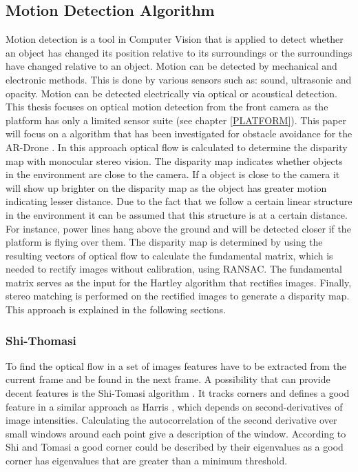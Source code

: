 \documentclass[a4paper]{article}
\begin{document}
\subsection{Motion Detection Algorithm}
\label{MOTION_DETECTION}
Motion detection is a tool in Computer Vision that is applied to detect whether an object has changed its position relative to its surroundings or the surroundings have changed relative to an object. Motion can be detected by mechanical and electronic methods. This is done by various sensors such as: sound, ultrasonic and opacity. Motion can be detected electrically via optical or acoustical detection. This thesis focuses on optical motion detection from the front camera as the platform has only a limited sensor suite (see chapter \ref{PLATFORM}). This paper will focus on a algorithm that has been investigated for obstacle avoidance for the AR-Drone \cite{Jurriaans2011}. In this approach optical flow is calculated to determine the disparity map with monocular stereo vision. The disparity map indicates whether objects in the environment are close to the camera. If a object is close to the camera it will show up brighter on the disparity map as the object has greater motion indicating lesser distance. Due to the fact that we follow a certain linear structure in the environment it can be assumed that this structure is at a certain distance. For instance, power lines hang above the ground and will be detected closer if the platform is flying over them.
The disparity map is determined by using the resulting vectors of optical flow to calculate the fundamental matrix, which is needed to rectify images without calibration, using RANSAC. The fundamental matrix serves as the input for the Hartley algorithm that rectifies images. Finally, stereo matching is performed on the rectified images to generate a disparity map. This approach is explained in the following sections.

\subsubsection{Shi-Thomasi}
To find the optical flow in a set of images features have to be extracted from the current frame and be found in the next frame. A possibility that can provide decent features is the Shi-Tomasi algorithm \cite{Shi1994}. It tracks corners and defines a good feature in a similar approach as Harris \cite{Harris1988}, which depends on second-derivatives of image intensities. Calculating the autocorrelation of the second derivative over small windows around each point give a description of the window. According to Shi and Tomasi a good corner could be described by their eigenvalues as a good corner has eigenvalues that are greater than a minimum threshold.
\end{document}
